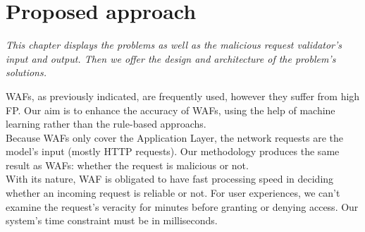 \chapter{Proposed approach}
\label{chap:proposed_approach}
	\textit{This chapter displays the problems as well as the malicious request validator's input and output. Then we offer the design and architecture of the problem's solutions.}
\minitoc

WAFs, as previously indicated, are frequently used, however they suffer from high FP. Our aim is to enhance the accuracy of WAFs, using the help of machine learning rather than the rule-based approachs.  \\
Because WAFs only cover the Application Layer, the network requests are the model's input (mostly HTTP requests). Our methodology produces the same result as WAFs: whether the request is malicious or not.\\
With its nature, WAF is obligated to have fast processing speed in deciding whether an incoming request is reliable or not. For user experiences, we can't examine the request's veracity for minutes before granting or denying access. Our system's time constraint must be in milliseconds.\\
